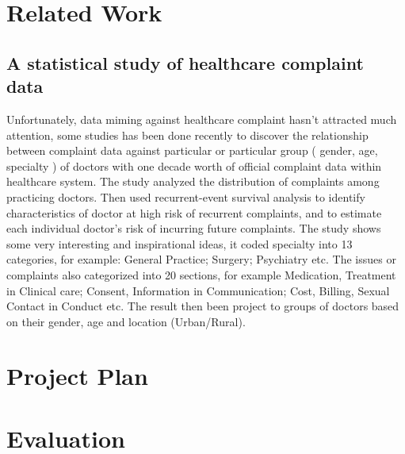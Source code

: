 \documentclass[a4paper,11pt]{article}
\begin{document}
\section{Related Work}
\subsection{A statistical study of healthcare complaint data}
Unfortunately, data miming against healthcare complaint hasn’t attracted much attention,  some studies has been done recently to discover the relationship between complaint data against particular or particular group ( gender, age, specialty ) of doctors with one decade worth of official complaint data within healthcare system. The study analyzed the distribution of complaints among practicing doctors. Then used recurrent-event survival analysis to identify characteristics of doctor at high risk of recurrent complaints, and to estimate each individual doctor’s risk of incurring future complaints. The study shows some very interesting and inspirational ideas, it coded specialty into 13 categories, for example: General Practice; Surgery; Psychiatry etc. The issues or complaints also categorized into 20 sections, for example Medication, Treatment in Clinical care; Consent, Information in Communication; Cost, Billing, Sexual Contact in Conduct etc. The result then been project to groups of doctors based on their gender, age and location (Urban/Rural). 

\section{Project Plan}

\section{Evaluation}
\end{document}
